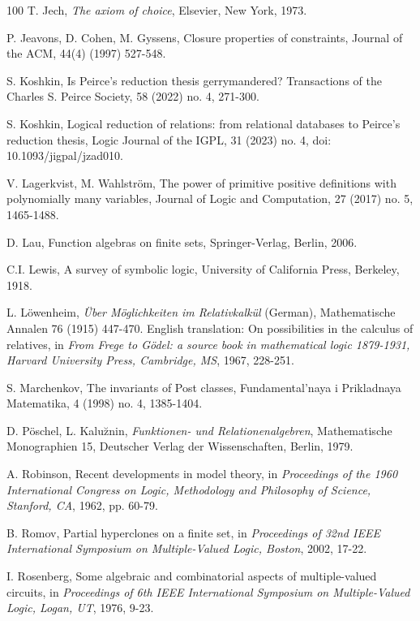 \documentclass[11pt]{article}
\theoremstyle{plain}
\theoremstyle{definition}
\begin{document}
{\begin{thebibliography}{100}
 T. Jech, {\it The axiom of choice}, Elsevier, New York, 1973.

 P. Jeavons, D. Cohen, M. Gyssens, Closure properties of constraints, Journal of the ACM, 44(4) (1997) 527-548.

 S. Koshkin, Is Peirce's reduction thesis gerrymandered? Transactions of the Charles S. Peirce Society, 58 (2022) no. 4, 271-300.

 S. Koshkin, Logical reduction of relations: from relational databases to Peirce’s reduction thesis, Logic Journal of the IGPL, 31 (2023) no. 4, doi:\,10.1093/jigpal/jzad010.

 V. Lagerkvist, M. Wahlstr\"om, The power of primitive positive definitions with polynomially many variables, Journal of Logic and Computation, 27 (2017) no. 5, 1465-1488. 

 D. Lau, Function algebras on finite sets, Springer-Verlag, Berlin, 2006.

 C.I. Lewis, A survey of symbolic logic, University of California Press, Berkeley, 1918. 


 L. L\"owenheim, {\it \"Uber M\"oglichkeiten im Relativkalk\"ul} (German), Mathematische Annalen 76 (1915) 447-470. English translation: On possibilities in the calculus of relatives, in {\it From Frege to G\"odel: a source book in mathematical logic 1879-1931, Harvard University Press, Cambridge, MS}, 1967, 228-251.

 S. Marchenkov, The invariants of Post classes, Fundamental'naya i Prikladnaya Matematika, 4 (1998) no. 4, 1385-1404.

 D. P\"oschel, L. Kalu\u{z}nin, {\it Funktionen- und Relationenalgebren}, Mathematische Monographien 15, Deutscher Verlag der Wissenschaften, Berlin, 1979.

 A. Robinson, Recent developments in model theory, in {\it Proceedings of the 1960 International Congress on Logic, Methodology and Philosophy of Science, Stanford, CA}, 1962, pp. 60-79.

 B. Romov, Partial hyperclones on a finite set, in {\it Proceedings of 32nd IEEE International Symposium on Multiple-Valued Logic, Boston}, 2002, 17-22.

 I. Rosenberg, Some algebraic and combinatorial aspects of multiple-valued circuits, in {\it Proceedings of 6th IEEE International Symposium on Multiple-Valued Logic, Logan, UT}, 1976, 9-23.


\end{thebibliography}}
\end{document}
